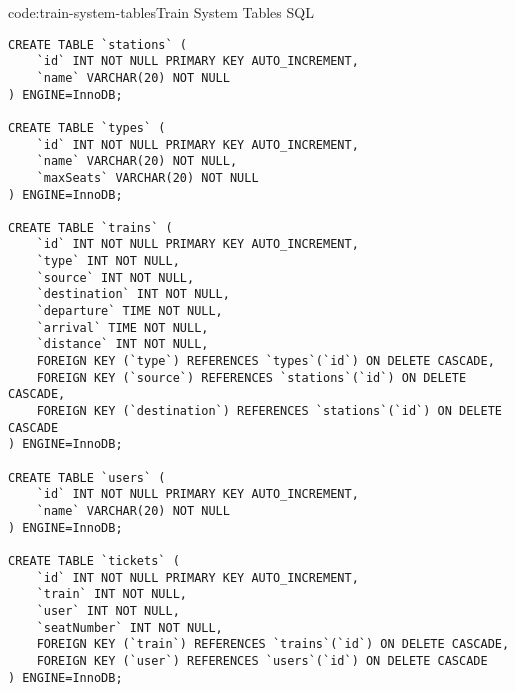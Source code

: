 \begin{codeenv}{code:train-system-tables}{Train System Tables SQL}\begin{verbatim}
CREATE TABLE `stations` (
    `id` INT NOT NULL PRIMARY KEY AUTO_INCREMENT,
    `name` VARCHAR(20) NOT NULL
) ENGINE=InnoDB;

CREATE TABLE `types` (
    `id` INT NOT NULL PRIMARY KEY AUTO_INCREMENT,
    `name` VARCHAR(20) NOT NULL,
    `maxSeats` VARCHAR(20) NOT NULL
) ENGINE=InnoDB;

CREATE TABLE `trains` (
    `id` INT NOT NULL PRIMARY KEY AUTO_INCREMENT,
    `type` INT NOT NULL,
    `source` INT NOT NULL,
    `destination` INT NOT NULL,
    `departure` TIME NOT NULL,
    `arrival` TIME NOT NULL,
    `distance` INT NOT NULL,
    FOREIGN KEY (`type`) REFERENCES `types`(`id`) ON DELETE CASCADE,
    FOREIGN KEY (`source`) REFERENCES `stations`(`id`) ON DELETE CASCADE,
    FOREIGN KEY (`destination`) REFERENCES `stations`(`id`) ON DELETE CASCADE
) ENGINE=InnoDB;

CREATE TABLE `users` (
    `id` INT NOT NULL PRIMARY KEY AUTO_INCREMENT,
    `name` VARCHAR(20) NOT NULL
) ENGINE=InnoDB;

CREATE TABLE `tickets` (
    `id` INT NOT NULL PRIMARY KEY AUTO_INCREMENT,
    `train` INT NOT NULL,
    `user` INT NOT NULL,
    `seatNumber` INT NOT NULL,
    FOREIGN KEY (`train`) REFERENCES `trains`(`id`) ON DELETE CASCADE,
    FOREIGN KEY (`user`) REFERENCES `users`(`id`) ON DELETE CASCADE
) ENGINE=InnoDB;
\end{verbatim}
\end{codeenv}
\newpage

